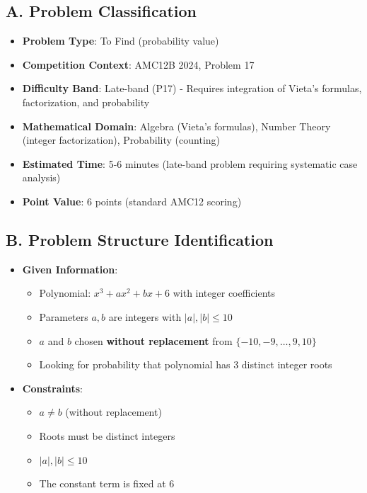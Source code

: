 \documentclass[12pt]{article}
\begin{document}
\begin{problemconfigbox}
\subsection*{A. Problem Classification}
\begin{itemize}[leftmargin=*]
    \item \textbf{Problem Type}: To Find (probability value)
    \item \textbf{Competition Context}: AMC12B 2024, Problem 17
    \item \textbf{Difficulty Band}: Late-band (P17) - Requires integration of Vieta's formulas, factorization, and probability
    \item \textbf{Mathematical Domain}: Algebra (Vieta's formulas), Number Theory (integer factorization), Probability (counting)
    \item \textbf{Estimated Time}: 5-6 minutes (late-band problem requiring systematic case analysis)
    \item \textbf{Point Value}: 6 points (standard AMC12 scoring)
\end{itemize}

\subsection*{B. Problem Structure Identification}
\begin{itemize}[leftmargin=*]
    \item \textbf{Given Information}: 
    \begin{itemize}
        \item Polynomial: $x^3 + ax^2 + bx + 6$ with integer coefficients
        \item Parameters $a, b$ are integers with $|a|, |b| \leq 10$
        \item $a$ and $b$ chosen \textbf{without replacement} from $\{-10, -9, \ldots, 9, 10\}$
        \item Looking for probability that polynomial has 3 distinct integer roots
    \end{itemize}
    
    \item \textbf{Constraints}: 
    \begin{itemize}
        \item $a \neq b$ (without replacement)
        \item Roots must be distinct integers
        \item $|a|, |b| \leq 10$
        \item The constant term is fixed at 6
    \end{itemize}
    

\end{itemize}
\end{problemconfigbox}
\end{document}
